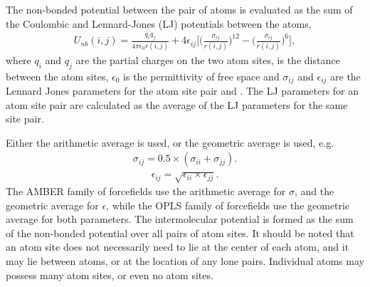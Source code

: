 \documentclass[letterpaper,10pt,english]{sphinxmanual}
\begin{document}
The non-bonded potential between the pair of atoms is evaluated as the sum of the Coulombic and Lennard-Jones (LJ) potentials between the atoms,
\begin{equation}\label{equation:protoms:intermol2}
\begin{split}U_{nb}(i,j) = \frac{q_i q_j}{4\pi\epsilon_{0} r(i,j)} + 4\epsilon_{ij}\biggl[ \biggl(\frac{\sigma_{ij}}{r(i,j)}\biggr)^{12} - \biggl(\frac{\sigma_{ij}}{r(i,j)}\biggr)^6 \biggr],\end{split}
\end{equation}
where \(q_i\) and \(q_j\) are the partial charges on the two atom sites,  is the distance between the atom sites, \(\epsilon_0\) is the permittivity of free space and \(\sigma_{ij}\) and \(\epsilon_{ij}\) are the Lennard Jones parameters for the atom site pair  and . The LJ parameters for an atom site pair are calculated as the average of the LJ parameters for the same site pair.

\ignorespaces 
Either the arithmetic average is used, or the geometric average is used, e.g.
\begin{equation}\label{equation:protoms:arithmetriccomb}
\begin{split}\sigma_{ij} = 0.5\times(\sigma_{ii} + \sigma_{jj}).\end{split}
\end{equation}\begin{equation}\label{equation:protoms:geometriccomb}
\begin{split}\epsilon_{ij} = \sqrt{\epsilon_{ii}\times\epsilon_{jj}}.\end{split}
\end{equation}
The AMBER family of forcefields use the arithmetic average for \(\sigma\), and the geometric average for \(\epsilon\), while the OPLS family of forcefields use the geometric average for both parameters. The intermolecular potential is formed as the sum of the non-bonded potential over all pairs of atom sites. It should be noted that an atom site does not necessarily need to lie at the center of each atom, and it may lie between atoms, or at the location of any lone pairs. Individual atoms may possess many atom sites, or even no atom sites.

\ignorespaces 
{}
\end{document}
